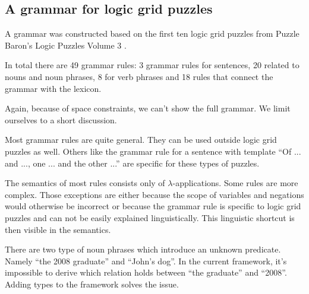 \subsection{A grammar for logic grid puzzles}
A grammar was constructed based on the first ten logic grid puzzles from Puzzle Baron's Logic Puzzles Volume 3 \cite{logigrammen}.

In total there are 49 grammar rules: 3 grammar rules for sentences, 20 related to nouns and noun phrases, 8 for verb phrases and 18 rules that connect the grammar with the lexicon.

Again, because of space constraints, we can't show the full grammar. We limit ourselves to a short discussion.

Most grammar rules are quite general. They can be used outside logic grid puzzles as well. Others like the grammar rule for a sentence with template ``Of ... and ..., one ... and the other ...'' are specific for these types of puzzles.

The semantics of most rules consists only of $\lambda$-applications. Some rules are more complex. Those exceptions are either because the scope of variables and negations would otherwise be incorrect or because the grammar rule is specific to logic grid puzzles and can not be easily explained linguistically. This linguistic shortcut is then visible in the semantics.

There are two type of noun phrases which introduce an unknown predicate. Namely ``the 2008 graduate'' and ``John's dog''. In the current framework, it's impossible to derive which relation holds between ``the graduate'' and ``2008''. Adding types to the framework solves the issue.
